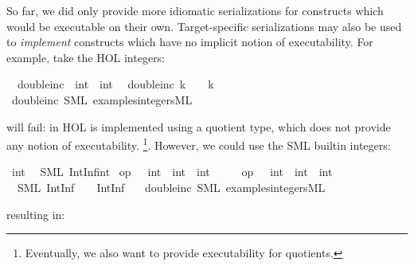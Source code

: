 \begin{isabellebody}
\begin{isamarkuptext}
  So far, we did only provide more idiomatic serializations for
  constructs which would be executable on their own.  Target-specific
  serializations may also be used to \emph{implement} constructs
  which have no implicit notion of executability.  For example,
  take the HOL integers:%
\end{isamarkuptext}%
\isamarkuptrue%
\isamarkupfalse%
\isanewline
\ \ double{\isacharunderscore}inc\ {\isacharcolon}{\isacharcolon}\ {\isachardoublequoteopen}int\ {\isasymRightarrow}\ int{\isachardoublequoteclose}\isanewline
\ \ {\isachardoublequoteopen}double{\isacharunderscore}inc\ k\ {\isacharequal}\ {}\ {\isacharasterisk}\ k\ {\isacharplus}\ {}{\isachardoublequoteclose}\isanewline
\isanewline
{}\isamarkupfalse%
\ double{\isacharunderscore}inc\ {\isacharparenleft}SML\ {\isachardoublequoteopen}examples{\isacharslash}integers{\isachardot}ML{\isachardoublequoteclose}{\isacharparenright}%
\begin{isamarkuptext}%
will fail:  in HOL is implemented using a quotient
  type, which does not provide any notion of executability.
  \footnote{Eventually, we also want to provide executability
  for quotients.}.  However, we could use the SML builtin
  integers:%
\end{isamarkuptext}%
\isamarkuptrue%
%
\isadelimtt
%
\endisadelimtt
%
\isatagtt
{}\isamarkupfalse%
\ int\isanewline
\ \ {\isacharparenleft}SML\ {\isachardoublequoteopen}IntInf{\isachardot}int{\isachardoublequoteclose}{\isacharparenright}\isanewline
\isanewline
{}\isamarkupfalse%
\ {\isachardoublequoteopen}op\ {\isacharplus}\ {\isasymColon}\ int\ {\isasymRightarrow}\ int\ {\isasymRightarrow}\ int{\isachardoublequoteclose}\isanewline
\ \ \ \ \ {\isachardoublequoteopen}op\ {\isacharasterisk}\ {\isasymColon}\ int\ {\isasymRightarrow}\ int\ {\isasymRightarrow}\ int{\isachardoublequoteclose}\isanewline
\ \ {\isacharparenleft}SML\ {\isachardoublequoteopen}IntInf{\isachardot}{\isacharplus}\ {\isacharparenleft}{\isacharunderscore}{\isacharcomma}\ {\isacharunderscore}{\isacharparenright}{\isachardoublequoteclose}\ \ {\isachardoublequoteopen}IntInf{\isachardot}{\isacharasterisk}\ {\isacharparenleft}{\isacharunderscore}{\isacharcomma}\ {\isacharunderscore}{\isacharparenright}{\isachardoublequoteclose}{\isacharparenright}%
\endisatagtt
{\isafoldtt}%
%
\isadelimtt
%
\endisadelimtt
\isanewline
\isanewline
{}\isamarkupfalse%
\ double{\isacharunderscore}inc\ {\isacharparenleft}SML\ {\isachardoublequoteopen}examples{\isacharslash}integers{\isachardot}ML{\isachardoublequoteclose}{\isacharparenright}%
\begin{isamarkuptext}%
resulting in:


\end{isamarkuptext}
\end{isabellebody}
